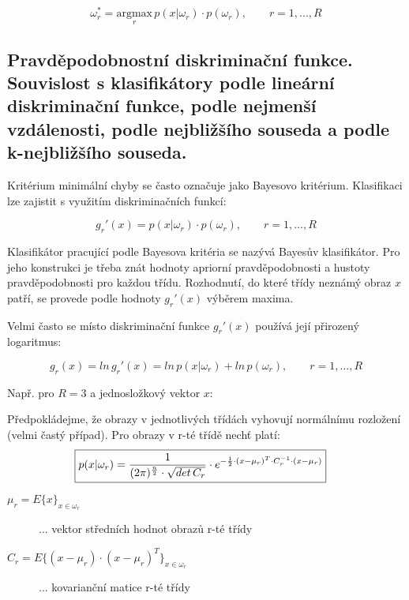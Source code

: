 \begin{equation}
\omega_r^* = \underset{r}{\mathrm{argmax}} \, p(x|\omega_r) \cdot p(\omega_r), \qquad r=1,...,R
\end{equation}

\subsection{Pravděpodobnostní diskriminační funkce. Souvislost s klasifikátory podle lineární diskriminační funkce, podle nejmenší vzdálenosti, podle nejbližšího souseda a podle k-nejbližšího souseda.}
Kritérium minimální chyby se často označuje jako Bayesovo kritérium. Klasifikaci lze zajistit s využitím diskriminačních funkcí:

\begin{equation}
g_r'(x) = p(x|\omega_r) \cdot p(\omega_r), \qquad r=1,...,R
\end{equation}

Klasifikátor pracující podle Bayesova kritéria se nazývá Bayesův klasifikátor. Pro jeho konstrukci je třeba znát hodnoty apriorní pravděpodobnosti a hustoty pravděpodobnosti pro každou třídu. Rozhodnutí, do které třídy neznámý obraz $ x $ patří, se provede podle hodnoty $ g_r'(x) $ výběrem maxima.

Velmi často se místo diskriminační funkce $ g_r'(x) $ používá její přirozený logaritmus:

\begin{equation}
g_r(x) = ln \, g_r'(x) = ln \, p(x|\omega_r) + ln \, p(\omega_r), \qquad r=1,...,R
\end{equation}

Např. pro $ R = 3 $ a jednosložkový vektor $ x $:

\vspace{3cm}

Předpokládejme, že obrazy v jednotlivých třídách vyhovují normálnímu rozložení (velmi častý případ). Pro obrazy v r-té třídě nechť platí:
\begin{align}
\Aboxed{p(x|\omega_r) = \frac{1}{(2\pi)^{\frac{n}{2}} \cdot \sqrt{det \, C_r}} \cdot e^{-\frac{1}{2} \cdot (x-\mu_r)^T \cdot C_r^{-1} \cdot (x-\mu_r)}}
\end{align}
\begin{description}
\item[$ \mu_r = E\{x\}_{x \in \omega_r} $] ... vektor středních hodnot obrazů r-té třídy
\item[$ C_r = E\{(x-\mu_r) \cdot (x-\mu_r)^T\}_{x \in \omega_r} $] ... kovarianční matice r-té třídy
\end{description}

